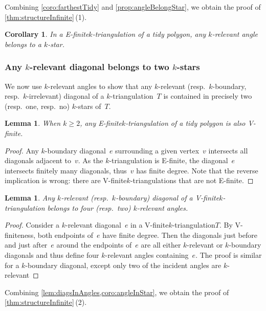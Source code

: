 \documentclass{amsart}
\newtheorem{lemma}[theorem]{Lemma}
\newtheorem{corollary}[theorem]{Corollary}
\theoremstyle{remark}
\newcommand*{\ef}[0]{E-finite\xspace}
\newcommand*{\vf}[0]{V-finite\xspace}
\newcommand*{\ktg}[0]{$k$-triangulation\xspace}
\begin{document}
Combining \cref{coro:farthestTidy} and \cref{prop:angleBelongStar}, we obtain the proof of \cref{thm:structureInfinite}\,(1).

\begin{corollary}
\label{coro:angleInStar}
In a \ef \ktg of a tidy polygon, any $k$-relevant angle belongs to a $k$-star.
\end{corollary}


\subsubsection{Any $k$-relevant diagonal belongs to two $k$-stars}

We now use $k$-relevant angles to show that any $k$-relevant (resp.~$k$-boundary, resp.~$k$-irrelevant) diagonal of a $k$-triangulation~$T$ is contained in precisely two (resp.~one, resp.~no) $k$-stars of~$T$.

\begin{lemma}
When $k\geq 2$, any \ef \ktg of a tidy polygon is also \vf.
\end{lemma}

\begin{proof}
Any $k$-boundary diagonal~$e$ surrounding a given vertex~$v$ intersects all diagonals adjacent to~$v$.
As the $k$-triangulation is \ef, the diagonal~$e$ intersects finitely many diagonals, thus~$v$ has finite degree.
Note that the reverse implication is wrong: there are \vf $k$-triangulations that are not \ef.
\end{proof}

\begin{lemma}
\label{lem:diagsInAngles}
Any $k$-relevant (resp.~$k$-boundary) diagonal of a \vf \ktg belongs to four (resp.~two) $k$-relevant angles.
\end{lemma}

\begin{proof}
Consider a $k$-relevant diagonal~$e$ in a \vf \ktg $T$.
By \vf{}ness, both endpoints of~$e$ have finite degree.
Then the diagonals just before and just after~$e$ around the endpoints of~$e$ are all either $k$-relevant or $k$-boundary diagonals and thus define four $k$-relevant angles containing~$e$.
The proof is similar for a $k$-boundary diagonal, except only two of the incident angles are $k$-relevant
\end{proof}

Combining \cref{lem:diagsInAngles,coro:angleInStar}, we obtain the proof of \cref{thm:structureInfinite}\,(2).
\end{document}
